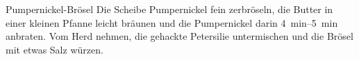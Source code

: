 \begin{recipe}{Pumpernickel-Brösel}{}{}
    Die Scheibe Pumpernickel fein zerbröseln, die Butter in einer kleinen Pfanne leicht bräunen und die Pumpernickel darin \SIrange{4}{5}{\minute} anbraten. Vom Herd nehmen, die gehackte Petersilie untermischen und die Brösel mit etwas Salz würzen.
    \freeform\hrulefill
\end{recipe}
